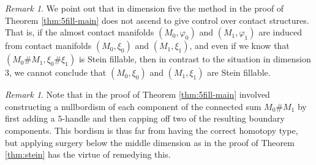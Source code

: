 \documentclass[12pt]{amsart}
\newcommand\acs{\varphi}  				%
\theoremstyle{remark}
\newtheorem{Remark}[Theorem]{Remark}
\begin{document}
\begin{Remark}
We point out that in dimension five the method in the proof of 
Theorem \ref{thm:5fill-main} does not ascend to 
give control over contact structures.  That is, if the almost contact manifolds
$(M_0, \acs_0)$ and $(M_1, \acs_1)$ are induced from contact manifolds $(M_0, \xi_0)$
and $(M_1, \xi_1)$, and even if we know that $(M_0 \# M_1, \xi_0 \# \xi_1)$ is 
Stein fillable, then in contrast to the situation in dimension 3,
we cannot conclude that $(M_0, \xi_0)$ and $(M_1, \xi_1)$
are Stein fillable.
%
\end{Remark}
\begin{Remark}
Note that in the proof of Theorem \ref{thm:5fill-main} involved constructing a nullbordism of each component of the connected sum $M_0 \# M_1$ by first adding a $5$-handle and then capping off two of the resulting boundary components. This bordism is thus far from having the correct homotopy type, but applying surgery below the middle dimension as in the proof of Theorem \ref{thm:stein} has the virtue of remedying this.
\end{Remark}
\end{document}
